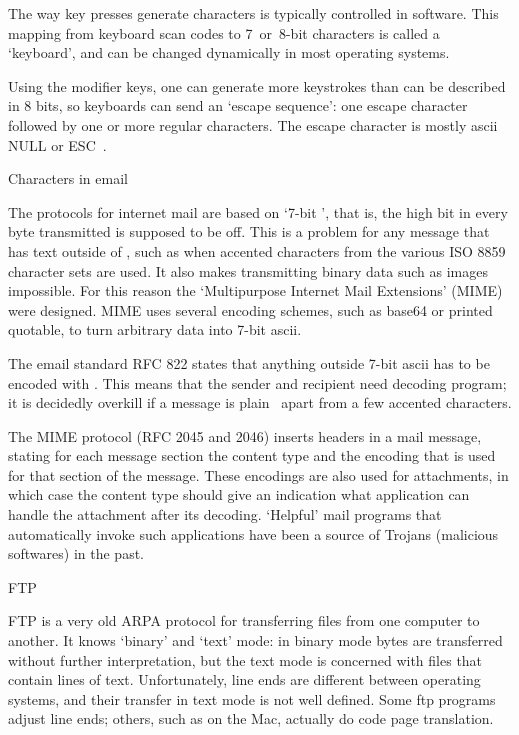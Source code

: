 The way key presses generate characters is typically controlled in
software. This mapping from keyboard scan codes to
7~or~8-bit characters is called a `keyboard', and can be changed
dynamically in most operating systems.

Using the modifier keys, one can generate more keystrokes than can be
described in 8 bits, so keyboards can send an `escape sequence': one escape character followed by one or
more regular characters. The escape character is mostly ascii NULL or
ESC~\cite{scancodes}.

 {Characters in email}\label{sec:mime}

The protocols for internet mail are based on `7-bit \ascii', that is,
the high bit in every byte transmitted is supposed to be off. This is
a problem for any message that has text outside of \ascii, such as
when accented characters from the various ISO 8859 character sets are
used. It also makes transmitting binary data such as images
impossible. For this reason the `Multipurpose Internet Mail
Extensions' (MIME) were designed. MIME uses several encoding schemes,
such as base64 or printed quotable, to turn arbitrary data into 7-bit
ascii.

The email standard RFC 822 states that anything outside 7-bit ascii
has to be encoded with . This means that the sender and
recipient need decoding program; it is decidedly overkill if a message
is plain \ascii\ apart from a few accented characters.

The MIME protocol (RFC 2045 and 2046) inserts headers in a mail
message, stating for each message section the content type and the
encoding that is used for that section of the
message. These encodings are also used for attachments, in which case
the content type should give an indication what application can handle
the attachment after its decoding. `Helpful' mail programs that
automatically invoke such applications have been a source of Trojans
(malicious softwares) in the past.

 {FTP}

FTP is a very old ARPA protocol for transferring files from one
computer to another. It knows `binary' and `text' mode: in binary mode
bytes are transferred without further interpretation, but the text
mode is concerned with files that contain lines of text.
Unfortunately, line ends are different between operating systems, and
their transfer in text mode is not well defined. Some ftp programs
adjust line ends; others, such as  on the Mac, actually do
code page translation.

